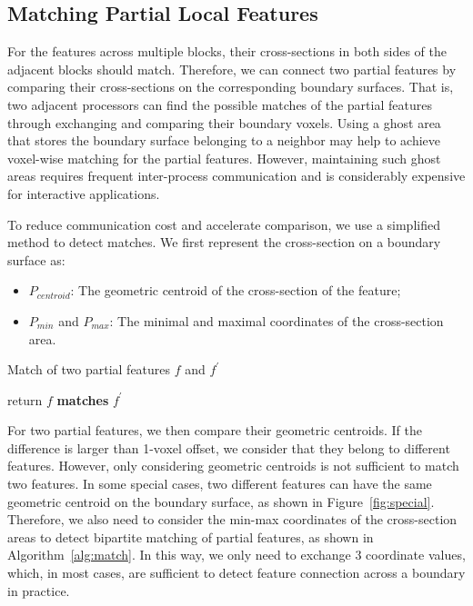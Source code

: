 \subsection{Matching Partial Local Features}

For the features across multiple blocks, their cross-sections in both sides of the adjacent blocks should match. Therefore, we can connect two partial features by comparing their cross-sections on the corresponding boundary surfaces. That is, two adjacent processors can find the possible matches of the partial features through exchanging and comparing their boundary voxels. Using a ghost area that stores the boundary surface belonging to a neighbor may help to achieve voxel-wise matching for the partial features. However, maintaining such ghost areas requires frequent inter-process communication and is considerably expensive for interactive applications. 

To reduce communication cost and accelerate comparison, we use a simplified method to detect matches. We first represent the cross-section on a boundary surface as:

\begin{itemize}
	\item $P_{centroid}$: The geometric centroid of the cross-section of the feature;
	\item $P_{min}$ and $P_{max}$: The minimal and maximal coordinates of the cross-section area.
\end{itemize}

\begin{algorithm}[t]
\caption{Match of two partial features $f$ and $f^{'}$}
	\begin{algorithmic}
			\STATE return $f$ \textbf{matches} $f^{'}$
		\ENDIF
	\end{algorithmic}
\label{alg:match}
\end{algorithm}

For two partial features, we then compare their geometric centroids. If the difference is larger than 1-voxel offset, we consider that they belong to different features. However, only considering geometric centroids is not sufficient to match two features. In some special cases, two different features can have the same geometric centroid on the boundary surface, as shown in Figure~\ref{fig:special}. Therefore, we also need to consider the min-max coordinates of the cross-section areas to detect bipartite matching of partial features, as shown in Algorithm~\ref{alg:match}. In this way, we only need to exchange 3 coordinate values, which, in most cases, are sufficient to detect feature connection across a boundary in practice.

